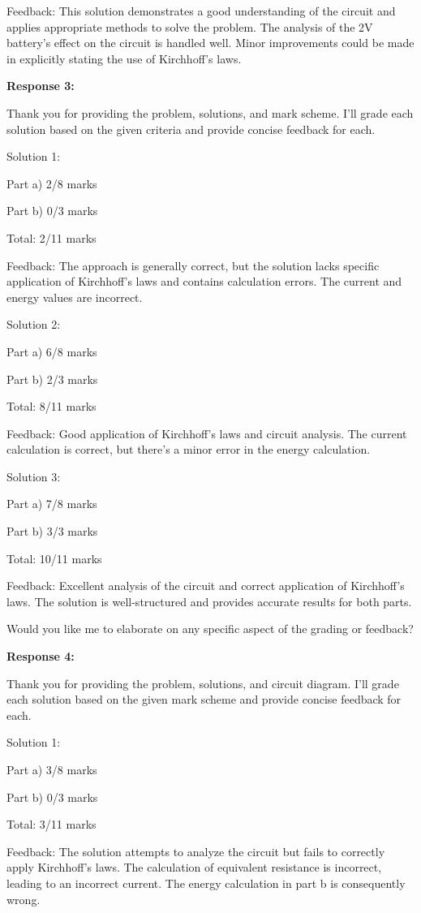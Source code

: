 \documentclass[a4paper,11pt]{article}
\begin{document}
Feedback: This solution demonstrates a good understanding of the circuit and applies appropriate methods to solve the problem. The analysis of the 2V battery's effect on the circuit is handled well. Minor improvements could be made in explicitly stating the use of Kirchhoff's laws.

\bigskip
\textbf{Response 3:}

Thank you for providing the problem, solutions, and mark scheme. I'll grade each solution based on the given criteria and provide concise feedback for each.

Solution 1:

Part a) 2/8 marks

Part b) 0/3 marks

Total: 2/11 marks

Feedback: The approach is generally correct, but the solution lacks specific application of Kirchhoff's laws and contains calculation errors. The current and energy values are incorrect.

Solution 2:

Part a) 6/8 marks

Part b) 2/3 marks

Total: 8/11 marks

Feedback: Good application of Kirchhoff's laws and circuit analysis. The current calculation is correct, but there's a minor error in the energy calculation.

Solution 3:

Part a) 7/8 marks

Part b) 3/3 marks

Total: 10/11 marks

Feedback: Excellent analysis of the circuit and correct application of Kirchhoff's laws. The solution is well-structured and provides accurate results for both parts.

Would you like me to elaborate on any specific aspect of the grading or feedback?

\bigskip
\textbf{Response 4:}

Thank you for providing the problem, solutions, and circuit diagram. I'll grade each solution based on the given mark scheme and provide concise feedback for each.

Solution 1:

Part a) 3/8 marks

Part b) 0/3 marks

Total: 3/11 marks

Feedback: The solution attempts to analyze the circuit but fails to correctly apply Kirchhoff's laws. The calculation of equivalent resistance is incorrect, leading to an incorrect current. The energy calculation in part b is consequently wrong.
\end{document}

